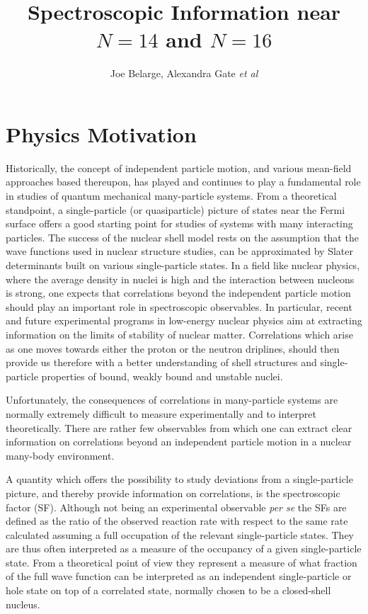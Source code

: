 \documentclass[prc,preprint,superscriptaddress,showpacs,floatfix]{revtex4-1}
\begin{document}
\title{Spectroscopic Information near $N=14$ and $N=16$}

\author{Joe Belarge, Alexandra Gate {\em et al}}

\maketitle


\section{Physics Motivation}
Historically, the concept of independent particle motion, and various
mean-field approaches based thereupon, has played and continues to
play a fundamental role in studies of quantum mechanical many-particle
systems.  From a theoretical standpoint, a single-particle (or
quasiparticle) picture of states near the Fermi surface offers a good
starting point for studies of systems with many interacting particles.
The success of the nuclear shell model rests on the assumption that
the wave functions used in nuclear structure studies, can be
approximated by Slater determinants built on various single-particle
states.  In a field like nuclear physics, where the average density in
nuclei is high and the interaction between nucleons is strong, one
expects that correlations beyond the independent particle motion
should play an important role in spectroscopic observables.  In
particular, recent and future experimental programs in low-energy
nuclear physics aim at extracting information on the limits of
stability of nuclear matter. Correlations which arise as one moves
towards either the proton or the neutron driplines, should then
provide us therefore with a better understanding of shell structures
and single-particle properties of bound, weakly bound and unstable
nuclei.

Unfortunately, the consequences of correlations in many-particle
systems are normally extremely difficult to measure experimentally and
to interpret theoretically. There are rather few observables from
which one can extract clear information on correlations beyond an
independent particle motion in a nuclear many-body environment.

A quantity which offers the possibility to study deviations from a
single-particle picture, and thereby provide information on
correlations, is the spectroscopic factor (SF). Although not being an
experimental observable {\em per se} the SFs are defined as the ratio
of the observed reaction rate with respect to the same rate calculated
assuming a full occupation of the relevant single-particle
states. They are thus often interpreted as a measure of the occupancy
of a given single-particle state. From a theoretical point of view
they represent a measure of what fraction of the full wave function
can be interpreted as an independent single-particle or hole state on
top of a correlated state, normally chosen to be a closed-shell
nucleus.
\end{document}
